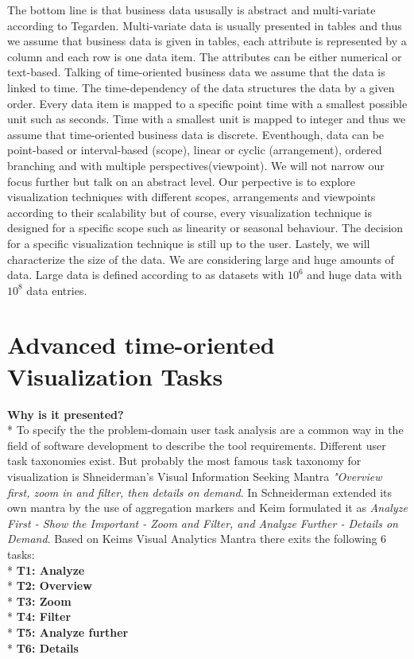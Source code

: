 The bottom line is that business data ususally is abstract and multi-variate according to Tegarden\cite{tegarden1999}. Multi-variate data is usually presented in tables\cite{Borgo2013} and thus we assume that business data is given in tables, each attribute is represented by a column and each row is one data item. The attributes can be either numerical or text-based. 
Talking of time-oriented business data we assume that the data is linked to time. The time-dependency of the data structures the data by a given order. Every data item is mapped to a specific point time with a smallest possible unit such as seconds. Time with a smallest unit is mapped to integer\cite{Aigner2011} and thus we assume that time-oriented business data is discrete. Eventhough, data can be point-based or interval-based (scope), linear or cyclic (arrangement), ordered branching and with multiple perspectives(viewpoint)\cite{Aigner2011}. We will not narrow our focus further but talk on an abstract level. Our perpective is to explore visualization techniques with different scopes, arrangements and viewpoints according to their scalability but of course, every visualization technique is designed for a specific scope such as linearity or seasonal behaviour. The decision for a specific visualization technique is still up to the user. 
Lastely, we will characterize the size of the data. We are considering large and huge amounts of data. Large data is defined according to\cite{Huber1994} as datasets with $10^6$ and huge data with $10^8$ data entries.


\section{Advanced time-oriented Visualization Tasks}
\textbf{Why is it presented?}\\*
To specify the the problem-domain user task analysis are a common way in the field of software development to describe the tool requirements\cite{Aigner2011}. Different user task taxonomies exist\cite{paterno1997concurtasktrees, Shneiderman2008, Keim2008}. But probably the most famous task taxonomy for visualization is Shneiderman's Visual Information Seeking Mantra \textit{"Overview first, zoom in and filter, then details on demand}. In \cite{Shneiderman2008} Schneiderman extended its own mantra by the use of aggregation markers and Keim formulated it as \textit{Analyze First - Show the Important - Zoom and Filter, and Analyze Further - Details on Demand}\cite{Keima}.
Based on Keims Visual Analytics Mantra there exits the following 6 tasks: 
\\*
\textbf{T1: Analyze}
\\*
\textbf{T2: Overview}
\\*
\textbf{T3: Zoom}
\\*
\textbf{T4: Filter}
\\*
\textbf{T5: Analyze further}
\\*
\textbf{T6: Details}


